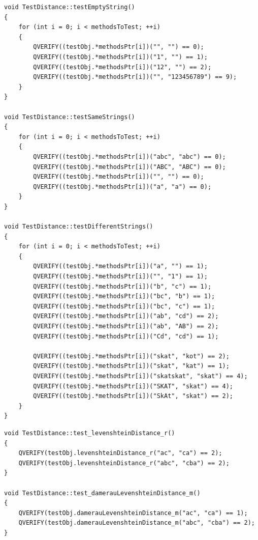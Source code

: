 \documentclass[14pt]{report}
\begin{document}
\begin{lstlisting}[label=some-code,caption=Общие тесты ]
void TestDistance::testEmptyString()
{
    for (int i = 0; i < methodsToTest; ++i)
    {
        QVERIFY((testObj.*methodsPtr[i])("", "") == 0);
        QVERIFY((testObj.*methodsPtr[i])("1", "") == 1);
        QVERIFY((testObj.*methodsPtr[i])("12", "") == 2);
        QVERIFY((testObj.*methodsPtr[i])("", "123456789") == 9);
    }
}

void TestDistance::testSameStrings()
{
    for (int i = 0; i < methodsToTest; ++i)
    {
        QVERIFY((testObj.*methodsPtr[i])("abc", "abc") == 0);
        QVERIFY((testObj.*methodsPtr[i])("ABC", "ABC") == 0);
        QVERIFY((testObj.*methodsPtr[i])("", "") == 0);
        QVERIFY((testObj.*methodsPtr[i])("a", "a") == 0);
    }
}

void TestDistance::testDifferentStrings()
{
    for (int i = 0; i < methodsToTest; ++i)
    {
        QVERIFY((testObj.*methodsPtr[i])("a", "") == 1);
        QVERIFY((testObj.*methodsPtr[i])("", "1") == 1);
        QVERIFY((testObj.*methodsPtr[i])("b", "c") == 1);
        QVERIFY((testObj.*methodsPtr[i])("bc", "b") == 1);
        QVERIFY((testObj.*methodsPtr[i])("bc", "c") == 1);
        QVERIFY((testObj.*methodsPtr[i])("ab", "cd") == 2);
        QVERIFY((testObj.*methodsPtr[i])("ab", "AB") == 2);
        QVERIFY((testObj.*methodsPtr[i])("Cd", "cd") == 1);

        QVERIFY((testObj.*methodsPtr[i])("skat", "kot") == 2);
        QVERIFY((testObj.*methodsPtr[i])("skat", "kat") == 1);
        QVERIFY((testObj.*methodsPtr[i])("skatskat", "skat") == 4);
        QVERIFY((testObj.*methodsPtr[i])("SKAT", "skat") == 4);
        QVERIFY((testObj.*methodsPtr[i])("SkAt", "skat") == 2);
    }
}
\end{lstlisting}

\begin{lstlisting}[label=some-code,caption=специфичные тесты ]
void TestDistance::test_levenshteinDistance_r()
{
    QVERIFY(testObj.levenshteinDistance_r("ac", "ca") == 2);
    QVERIFY(testObj.levenshteinDistance_r("abc", "cba") == 2);
}

void TestDistance::test_damerauLevenshteinDistance_m()
{
    QVERIFY(testObj.damerauLevenshteinDistance_m("ac", "ca") == 1);
    QVERIFY(testObj.damerauLevenshteinDistance_m("abc", "cba") == 2);
}
\end{lstlisting}
\end{document}

